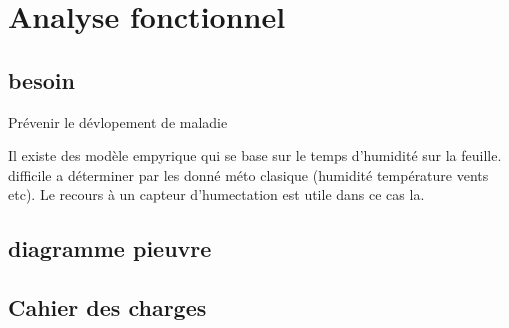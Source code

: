 \section{Analyse fonctionnel}
\subsection{besoin}
Prévenir le dévlopement de maladie

Il existe des modèle empyrique qui se base sur le temps d'humidité sur la feuille. difficile a déterminer par les donné méto clasique (humidité température vents etc). Le recours à un capteur d'humectation est utile dans ce cas la.

\subsection{diagramme pieuvre}

\subsection{Cahier des charges}

